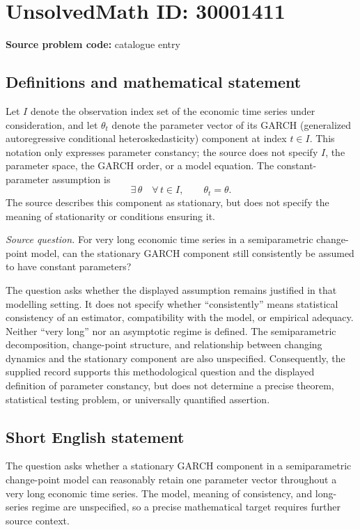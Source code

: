 \documentclass[11pt]{article}
\begin{document}
\section*{UnsolvedMath ID: 30001411}
\textbf{Source problem code:} catalogue entry
\subsection{Definitions and mathematical statement}
Let \(I\) denote the observation index set of the economic time series under consideration, and let \(\theta_t\) denote the parameter vector of its GARCH (generalized autoregressive conditional heteroskedasticity) component at index \(t\in I\). This notation only expresses parameter constancy; the source does not specify \(I\), the parameter space, the GARCH order, or a model equation. The constant-parameter assumption is
\[
\exists\,\theta\quad\forall\,t\in I,\qquad \theta_t=\theta.
\]
The source describes this component as stationary, but does not specify the meaning of stationarity or conditions ensuring it.

\emph{Source question.} For very long economic time series in a semiparametric change-point model, can the stationary GARCH component still consistently be assumed to have constant parameters?

The question asks whether the displayed assumption remains justified in that modelling setting. It does not specify whether ``consistently'' means statistical consistency of an estimator, compatibility with the model, or empirical adequacy. Neither ``very long'' nor an asymptotic regime is defined. The semiparametric decomposition, change-point structure, and relationship between changing dynamics and the stationary component are also unspecified. Consequently, the supplied record supports this methodological question and the displayed definition of parameter constancy, but does not determine a precise theorem, statistical testing problem, or universally quantified assertion.
\subsection{Short English statement}
The question asks whether a stationary GARCH component in a semiparametric change-point model can reasonably retain one parameter vector throughout a very long economic time series. The model, meaning of consistency, and long-series regime are unspecified, so a precise mathematical target requires further source context.
\end{document}
